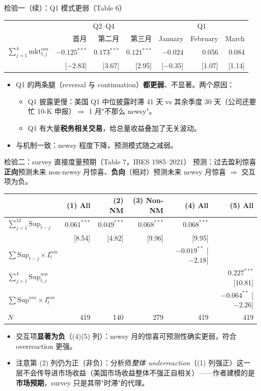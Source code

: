 \documentclass[aspectratio=169,10pt]{beamer}
\newcommand{\tighttable}{\scriptsize\setlength{\tabcolsep}{3pt}\renewcommand{\arraystretch}{1.12}}
\newcommand{\flag}{\ensuremath{\textstyle\sum_{j=1}^{4}\mathrm{mkt}^{nm}_{t,j}}}
\begin{document}
\begin{frame}{检验一（续）：Q1 模式更弱（Table 6）}
	\tighttable
	\begin{tabular}{lrrrrrr}
		\toprule
		& \multicolumn{3}{c}{Q2--Q4} & \multicolumn{3}{c}{Q1} \\
		& 首月 & 第二月 & 第三月 & January & February & March \\
		\midrule
		$\flag$ & $-0.125^{***}$ & $0.173^{***}$ & $0.121^{***}$ & $-0.024$ & 0.056 & 0.084 \\
		& [$-2.83$] & [3.67] & [2.95] & [$-0.35$] & [1.07] & [1.14] \\
		\bottomrule
	\end{tabular}
	\vspace{5pt}
	\begin{itemize}
		\item Q1 的两条腿（reversal 与 continuation）\textbf{都更弱}、不显著。两个原因：
		\begin{itemize}
			\item Q1 披露更慢：美国 Q1 中位披露时滞 41 天 vs 其余季度 30 天（公司还要忙 10-K 申报）$\Rightarrow$ 1 月"不那么 newsy"。
			\item Q1 有大量\textbf{税务相关交易}，给总量收益叠加了无关波动。
		\end{itemize}
		\item 与机制一致：newsy 程度下降，预测模式随之减弱。
	\end{itemize}
\end{frame}

\begin{frame}{检验二：survey 直接度量预期（Table 7，IBES 1985--2021）}
	预测：过去盈利惊喜\textbf{正向}预测未来 non-newsy 月惊喜、\textbf{负向}（相对）预测未来 newsy 月惊喜 $\Rightarrow$ 交互项为负。
	\tighttable
	\begin{tabular}{lrrrrr}
		\toprule
		& (1) All & (2) NM & (3) Non-NM & (4) All & (5) All \\
		\midrule
		$\sum_{j=1}^{12}\mathrm{Sup}_{t-j}$ & $0.061^{***}$ & $0.049^{***}$ & $0.068^{***}$ & $0.068^{***}$ & \\
		& [8.54] & [4.82] & [9.96] & [9.95] & \\
		$\sum\mathrm{Sup}_{t-j}\times I^{nm}_t$ & & & & $-0.019^{**}$ [$-2.18$] & \\
		$\sum_{j=1}^{4}\mathrm{Sup}^{nm}_{t,j}$ & & & & & $0.227^{***}$ [10.81] \\
		$\sum\mathrm{Sup}^{nm}\times I^{nm}_t$ & & & & & $-0.064^{**}$ [$-2.26$] \\
		$N$ & 419 & 140 & 279 & 419 & 419 \\
		\bottomrule
	\end{tabular}
	\vspace{3pt}
	\begin{itemize}
		\item 交互项\textbf{显著为负}（(4)(5) 列）：newsy 月的惊喜可预测性确实更弱，符合 overreaction 更强。
		\item 注意第 (2) 列仍为正（非负）：分析师\emph{整体 underreaction}（(1) 列强正）这一层不会传导进市场收益（美国市场收益整体不强正自相关）——作者建模的是\textbf{市场预期}，survey 只是其带"时滞"的代理。
	\end{itemize}
\end{frame}
\end{document}

